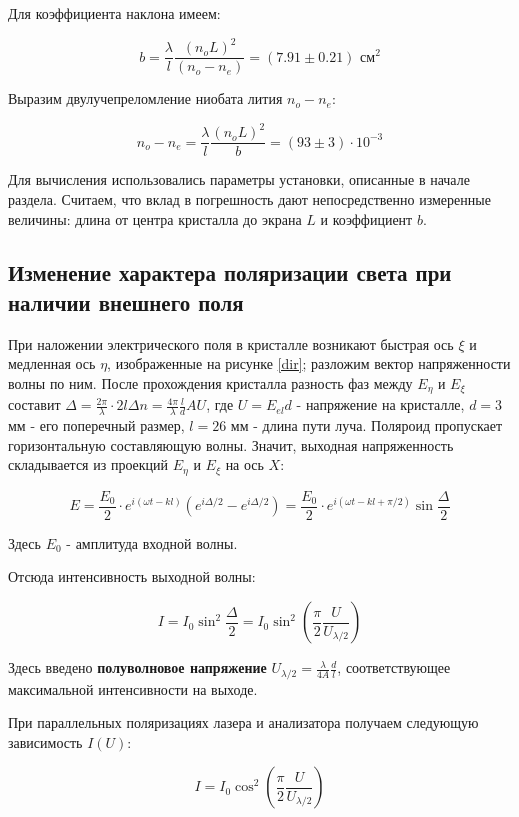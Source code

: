 \documentclass[a4paper,12pt]{article}
\begin{document}
	Для коэффициента наклона имеем: 
	
	\[ b = \frac{\lambda}{l} \frac{(n_oL)^2}{(n_o - n_e)} = (7.91 \pm 0.21) \text{ см}^2 \] 
	
	Выразим двулучепреломление ниобата лития $n_o - n_e$:
	
	\[ n_o - n_e = \frac{\lambda}{l}\frac{(n_oL)^2}{b} = (93 \pm 3) \cdot 10^{-3} \]
	
	Для вычисления использовались параметры установки, описанные в начале раздела. Считаем, что вклад в погрешность дают непосредственно измеренные величины: длина от центра кристалла до экрана $L$ и коэффициент $b$.

\subsection*{Изменение характера поляризации света при наличии внешнего поля}

При наложении электрического поля в кристалле возникают быстрая ось $\xi$ и медленная ось $\eta$, изображенные на рисунке \ref{dir}; разложим вектор напряженности волны по ним. После прохождения кристалла разность фаз между $E_\eta$ и $E_\xi$ составит $\Delta = \frac{2\pi}{\lambda} \cdot2l\Delta n = \frac{4\pi}{\lambda} \frac{l}{d} AU$, где $U = E_{el}d$ - напряжение на кристалле, $d = 3$ мм - его поперечный размер, $l = 26$ мм - длина пути луча. Поляроид пропускает горизонтальную составляющую волны. Значит, выходная напряженность складывается из проекций $E_\eta$ и $E_\xi$ на ось $X$:

\[ E = \frac{E_0}{2} \cdot e^{i(\omega t - kl)} (e^{i\Delta/2} - e^{i\Delta/2}) = \frac{E_0}{2} \cdot  e^{i(\omega t - kl + \pi/2)} \sin\frac{\Delta}{2} \]

Здесь $E_0$ - амплитуда входной волны.

Отсюда интенсивность выходной волны: 

\begin{equation}
I = I_0 \sin^2\frac{\Delta}{2} = I_0\sin^2 \left(\frac{\pi}{2}\frac{U}{U_{\lambda/2}}\right) 
\end{equation}

Здесь введено \textbf{полуволновое напряжение} $U_{\lambda/2} = \frac{\lambda}{4A}\frac{d}{l}$, соответствующее максимальной интенсивности на выходе.

При параллельных поляризациях лазера и анализатора получаем следующую зависимость $I(U)$:

\begin{equation}
I = I_0 \cos^2\left(\frac{\pi}{2}\frac{U}{U_{\lambda/2}}\right)
\end{equation} 
\end{document}
